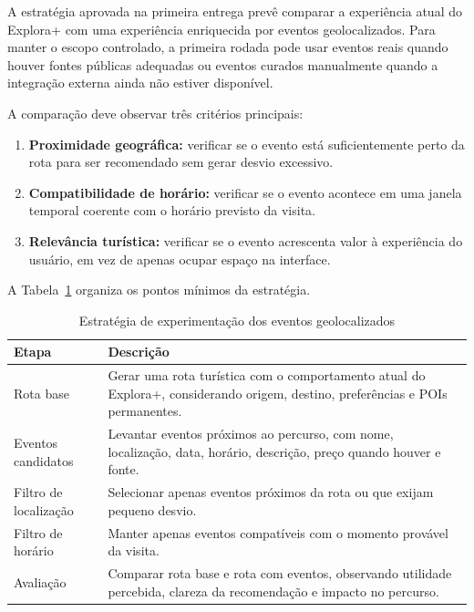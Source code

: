 \documentclass[12pt, a4paper]{article}
\begin{document}
A estrat\'egia aprovada na primeira entrega prev\^e comparar a experi\^encia atual do Explora+ com uma experi\^encia enriquecida por eventos geolocalizados. Para manter o escopo controlado, a primeira rodada pode usar eventos reais quando houver fontes p\'ublicas adequadas ou eventos curados manualmente quando a integra\c{c}\~ao externa ainda n\~ao estiver dispon\'ivel.

A compara\c{c}\~ao deve observar tr\^es crit\'erios principais:

\begin{enumerate}
  \item \textbf{Proximidade geogr\'afica:} verificar se o evento est\'a suficientemente perto da rota para ser recomendado sem gerar desvio excessivo.
  \item \textbf{Compatibilidade de hor\'ario:} verificar se o evento acontece em uma janela temporal coerente com o hor\'ario previsto da visita.
  \item \textbf{Relev\^ancia tur\'istica:} verificar se o evento acrescenta valor \`a experi\^encia do usu\'ario, em vez de apenas ocupar espa\c{c}o na interface.
\end{enumerate}

A Tabela~\ref{tab:experimentacao} organiza os pontos m\'inimos da estrat\'egia.

\begin{table}[H]
\centering
\caption{Estrat\'egia de experimenta\c{c}\~ao dos eventos geolocalizados}
\label{tab:experimentacao}
\begin{tabular}{p{4.0cm}p{9.0cm}}
\toprule
\textbf{Etapa} & \textbf{Descri\c{c}\~ao} \\
\midrule
Rota base & Gerar uma rota tur\'istica com o comportamento atual do Explora+, considerando origem, destino, prefer\^encias e POIs permanentes. \\
Eventos candidatos & Levantar eventos pr\'oximos ao percurso, com nome, localiza\c{c}\~ao, data, hor\'ario, descri\c{c}\~ao, pre\c{c}o quando houver e fonte. \\
Filtro de localiza\c{c}\~ao & Selecionar apenas eventos pr\'oximos da rota ou que exijam pequeno desvio. \\
Filtro de hor\'ario & Manter apenas eventos compat\'iveis com o momento prov\'avel da visita. \\
Avalia\c{c}\~ao & Comparar rota base e rota com eventos, observando utilidade percebida, clareza da recomenda\c{c}\~ao e impacto no percurso. \\
\bottomrule
\end{tabular}
\end{table}
\end{document}
